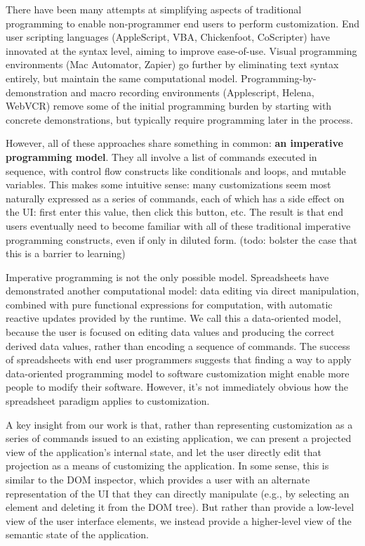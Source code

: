 \documentclass[sigplan,10pt,anonymous,review]{acmart}
\begin{document}
There have been many attempts at simplifying aspects of traditional
programming to enable non-programmer end users to perform customization.
End user scripting languages (AppleScript, VBA, Chickenfoot, CoScripter)
have innovated at the syntax level, aiming to improve ease-of-use.
Visual programming environments (Mac Automator, Zapier) go further by
eliminating text syntax entirely, but maintain the same computational
model. Programming-by-demonstration and macro recording environments
(Applescript, Helena, WebVCR) remove some of the initial programming
burden by starting with concrete demonstrations, but typically require
programming later in the process.

However, all of these approaches share something in common: \textbf{an
imperative programming model}. They all involve a list of commands
executed in sequence, with control flow constructs like conditionals and
loops, and mutable variables. This makes some intuitive sense: many
customizations seem most naturally expressed as a series of commands,
each of which has a side effect on the UI: first enter this value, then
click this button, etc. The result is that end users eventually need to
become familiar with all of these traditional imperative programming
constructs, even if only in diluted form. (todo: bolster the case that
this is a barrier to learning)

Imperative programming is not the only possible model. Spreadsheets have
demonstrated another computational model: data editing via direct
manipulation, combined with pure functional expressions for computation,
with automatic reactive updates provided by the runtime. We call this a
data-oriented model, because the user is focused on editing data values
and producing the correct derived data values, rather than encoding a
sequence of commands. The success of spreadsheets with end user
programmers suggests that finding a way to apply data-oriented
programming model to software customization might enable more people to
modify their software. However, it's not immediately obvious how the
spreadsheet paradigm applies to customization.

A key insight from our work is that, rather than representing
customization as a series of commands issued to an existing application,
we can present a projected view of the application's internal state, and
let the user directly edit that projection as a means of customizing the
application. In some sense, this is similar to the DOM inspector, which
provides a user with an alternate representation of the UI that they can
directly manipulate (e.g., by selecting an element and deleting it from
the DOM tree). But rather than provide a low-level view of the user
interface elements, we instead provide a higher-level view of the
semantic state of the application.
\end{document}
